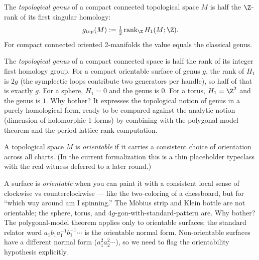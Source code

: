 \begin{definition}
\label{def:topological-genus}
The \emph{topological genus} of a compact connected topological
space \(M\) is half the \(\Z\)-rank of its first singular homology:
\[
  g_{\mathrm{top}}(M) := \tfrac{1}{2}\,\mathrm{rank}_{\Z}\,H_1(M;\Z).
\]
For compact connected oriented 2-manifolds the value equals the
classical genus.
\leanok
\end{definition}

\begin{layman}
The \emph{topological genus} of a compact connected space is half
the rank of its integer first homology group. For a compact
orientable surface of genus \(g\), the rank of \(H_1\) is \(2g\)
(the symplectic loops contribute two generators per handle), so
half of that is exactly \(g\). For a sphere, \(H_1 = 0\) and the
genus is \(0\). For a torus, \(H_1 = \Z^2\) and the genus is \(1\).
Why bother? It expresses the topological notion of genus in a
purely homological form, ready to be compared against the analytic
notion (dimension of holomorphic 1-forms) by combining with the
polygonal-model theorem and the period-lattice rank computation.
\end{layman}

\begin{definition}
\label{def:orientable}
A topological space \(M\) is \emph{orientable} if it carries a
consistent choice of orientation across all charts. (In the current
formalization this is a thin placeholder typeclass with the
real witness deferred to a later round.)
\leanok
\end{definition}

\begin{layman}
A surface is \emph{orientable} when you can paint it with a
consistent local sense of clockwise vs counterclockwise — like the
two-coloring of a chessboard, but for ``which way around am I
spinning.'' The Möbius strip and Klein bottle are not orientable;
the sphere, torus, and \(4g\)-gon-with-standard-pattern are. Why
bother? The polygonal-model theorem applies only to orientable
surfaces; the standard relator word \(a_1b_1a_1^{-1}b_1^{-1}\cdots\)
is the orientable normal form. Non-orientable surfaces have a
different normal form (\(a_1^2 a_2^2 \cdots\)), so we need to flag
the orientability hypothesis explicitly.
\end{layman}

